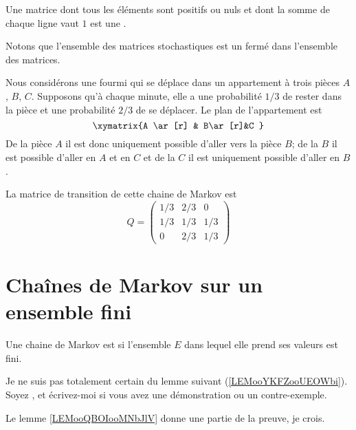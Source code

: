 \begin{definition}      \label{DefGJEBooZvuIAV}
	Une matrice dont tous les éléments sont positifs ou nuls et dont la somme de chaque ligne vaut \( 1\) est une .
\end{definition}
Notons que l'ensemble des matrices stochastiques est un fermé dans l'ensemble des matrices.

\begin{example}
	Nous considérons une fourmi qui se déplace dans un appartement à trois pièces \( A\), \( B\), \( C\). Supposons qu'à chaque minute, elle a une probabilité \( 1/3\) de rester dans la pièce et une probabilité \( 2/3\) de se déplacer. Le plan de l'appartement est
	\begin{equation}
		\xymatrix{%
			A \ar[r]      &  B\ar[r]&C
		}
	\end{equation}
	De la pièce \( A\) il est donc uniquement possible d'aller vers la pièce \( B\); de la \( B\) il est possible d'aller en \( A\) et en \( C\) et de la \( C\) il est uniquement possible d'aller en \( B\).

	La matrice de transition de cette chaine de Markov est
	\begin{equation}
		Q=\begin{pmatrix}
			1/3 & 2/3 & 0   \\
			1/3 & 1/3 & 1/3 \\
			0   & 2/3 & 1/3
		\end{pmatrix}
	\end{equation}
\end{example}


\section{Chaînes de Markov sur un ensemble fini}

\begin{definition}
	Une chaine de Markov est  si l'ensemble \( E\) dans lequel elle prend ses valeurs est fini.
\end{definition}

\begin{probleme}		\label{PROBooNEMXooLbPpIN}
	Je ne suis pas totalement certain du lemme suivant (\ref{LEMooYKFZooUEOWbi}). Soyez , et écrivez-moi si vous avez une démonstration ou un contre-exemple.

	Le lemme \ref{LEMooQBOIooMNbJlV} donne une partie de la preuve, je crois.
\end{probleme}

